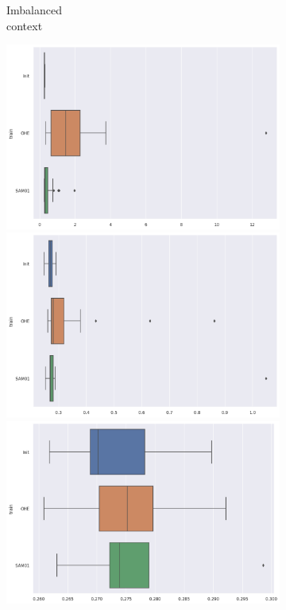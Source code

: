 \documentclass{article}
\theoremstyle{definition}
\begin{document}
\begin{figure}[ht]
\begin{subfigure}[b]{0.15\textwidth}
         \caption{Imbalanced \\ context}
         \label{Prediction_Imb_X}
     \end{subfigure}
     \begin{subfigure}[b]{0.15\textwidth}
         \centering
         \includegraphics[width=\textwidth]{imgs/Illu/1000Epochs/Bal/Boxplots_predTest_Xhat.png}
         \quad
         \includegraphics[width=\textwidth]{imgs/Illu/2000Epochs/Bal/Boxplots_predTest_Xhat.png}
         \quad
         \includegraphics[width=\textwidth]{imgs/Illu/3000Epochs/Bal/Boxplots_predTest_Xhat.png}   

\end{subfigure}
\end{figure}
\end{document}
